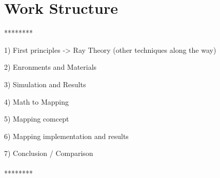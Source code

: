 \section{Work Structure}

********

1) First principles -> Ray Theory (other techniques along the way)

2) Enronments and Materials

3) Simulation and Results

4) Math to Mapping

5) Mapping comcept

6) Mapping implementation and results

7) Conclusion / Comparison
\\\\
********